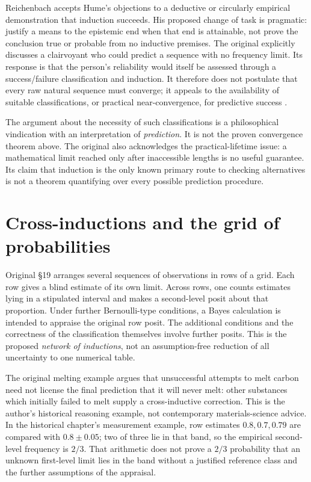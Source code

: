 Reichenbach accepts Hume's objections to a deductive or circularly
empirical demonstration that induction succeeds. His proposed change
of task is pragmatic: justify a means to the epistemic end when that
end is attainable, not prove the conclusion true or probable from no
inductive premises. The original explicitly discusses a clairvoyant
who could predict a sequence with no frequency limit. Its response is
that the person's reliability would itself be assessed through a
success/failure classification and induction. It therefore does not
postulate that every raw natural sequence must converge; it appeals
to the availability of suitable classifications, or practical
near-convergence, for predictive success
\cite[pp.~334--341]{Reichenbach1937Fondements}.

The argument about the necessity of such classifications is a
philosophical vindication with an interpretation of \emph{prediction}.
It is not the proven convergence theorem above. The original also
acknowledges the practical-lifetime issue: a mathematical limit reached
only after inaccessible lengths is no useful guarantee. Its claim that
induction is the only known primary route to checking alternatives is
not a theorem quantifying over every possible prediction procedure.

\section{Cross-inductions and the grid of probabilities}
\label{sec:p15-reichenbach-cross-inductions}

Original §19 arranges several sequences of observations in rows of
a grid. Each row gives a blind estimate of its own limit. Across rows,
one counts estimates lying in a stipulated interval and makes a
second-level posit about that proportion. Under further Bernoulli-type
conditions, a Bayes calculation is intended to appraise the original
row posit. The additional conditions and the correctness of the
classification themselves involve further posits. This is the proposed
\emph{network of inductions}, not an assumption-free reduction of
all uncertainty to one numerical table.

The original melting example argues that unsuccessful attempts to
melt carbon need not license the final prediction that it will never
melt: other substances which initially failed to melt supply a
cross-inductive correction. This is the author's historical reasoning
example, not contemporary materials-science advice. In the historical
chapter's measurement example, row estimates \(0.8,0.7,0.79\)
are compared with \(0.8\pm0.05\); two of three lie in that band,
so the empirical second-level frequency is \(2/3\). That arithmetic
does not prove a \(2/3\) probability that an unknown first-level
limit lies in the band without a justified reference class and the
further assumptions of the appraisal.


